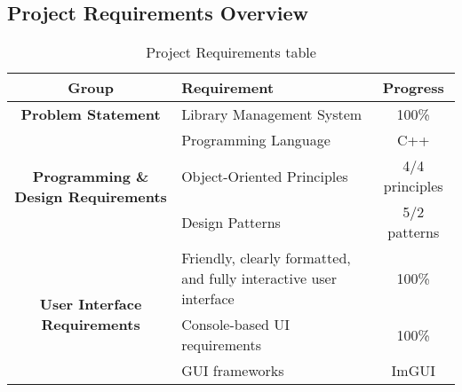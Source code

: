 \subsection*{Project Requirements Overview}
\begin{center}
    \begin{table}[H]
        \renewcommand{\arraystretch}{1.5}
        \setlength{\tabcolsep}{8pt}
        
        \begin{tabularx}{\textwidth}{| c | X | c |}
            \hline
            \rowcolor{gray!30}
            \textbf{Group} & \textbf{Requirement} & \textbf{Progress} \\
            \hline

           \textbf{Problem Statement}
            & Library Management System & 100\% \\
            \hline
            
            \multirow{3}{*}{\parbox{4cm}{\centering\textbf{Programming \& Design Requirements}}}
            & Programming Language & C++ \\
            \cline{2-3}
             & Object-Oriented Principles & 4/4 principles \\
            \cline{2-3}
             & Design Patterns & 5/2 patterns \\
            \hline

            \multirow{3}{*}{\parbox{4cm}{\centering\textbf{User Interface Requirements}}}
            & Friendly, clearly formatted, and fully interactive user interface & 100\% \\
            \cline{2-3}
             & Console-based UI requirements & 100\% \\
            \cline{2-3}
             & GUI frameworks & ImGUI \\
            \cline{2-3}
            \hline
        \end{tabularx}
        
        \caption{Project Requirements table}
    \end{table}
\end{center}

\newpage

